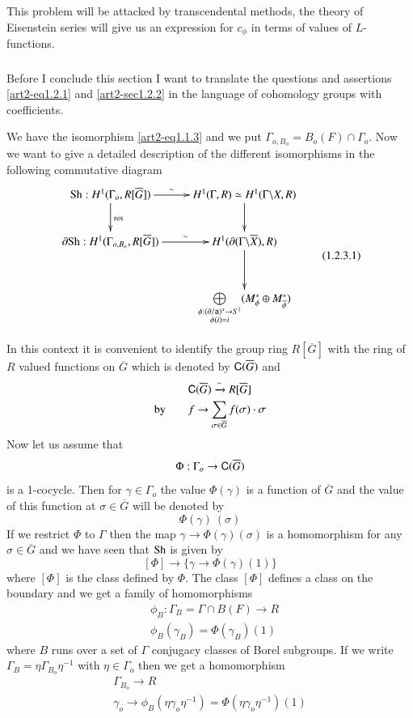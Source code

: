 This problem will be attacked by transcendental methods, the theory of Eisenstein series will give us an expression for $c_{\phi}$ in terms of values of $L$-functions.

\subsubsection{}\label{art2-sec1.2.3}
Before I conclude this section I want to translate the questions and assertions \ref{art2-eq1.2.1} and \ref{art2-sec1.2.2} in the language of cohomology groups with coefficients.

We have the isomorphism \eqref{art2-eq1.1.3} and we put $\Gamma_{o,B_{o}}=B_{o}(F)\cap \Gamma_{o}$. Now we want to give a detailed description of the different isomorphisms in the following commutative diagram
\begin{equation*}
\vcenter{\xymatrix{
\Sh : H^{1}(\Gamma_{o},R[\overline{G}])\ar[r]^-{\sim} \ar[d]^{\res} & H^{1}(\Gamma,R)\simeq H^{1}(\Gamma\backslash X,R)\ar[d]\\
\partial \Sh:H^{1}(\Gamma_{o,B_{o}},R[\overline{G}])\ar[r]^-{\sim} & H^{1}(\partial(\Gamma\backslash \overline{X}),R)\ar[d]\\
 & \bigoplus\limits_{\substack{\phi:(\partial/\sfa)^{x}\to S^{1}\\ \phi(i)=i}}(M^{*}_{\phi}\oplus M^{*}_{\overline{\phi}})
}}\tag{1.2.3.1}\label{art2-eq1.2.3.1}
\end{equation*}

In this context it is convenient to identify the group ring $R[\overline{G}]$ with the ring of $R$ valued functions on $\overline{G}$ which is denoted by $\mathsf{C}(\overline{G})$ and
\begin{align*}
& \mathsf{C}(\overline{G})\xrightarrow{\sim}R[\overline{G}]\\
\text{by}\qquad & f\to \sum\limits_{\sigma\in \overline{G}}f(\sigma)\cdot \sigma
\end{align*}
Now let us assume that
$$
\Phi :\Gamma_{o}\to \mathsf{C}(\overline{G})
$$
is a 1-cocycle. Then for $\gamma\in \Gamma_{o}$ the value $\Phi(\gamma)$ is a function of $\overline{G}$ and the value of this function at $\sigma\in \overline{G}$ will be denoted by
$$
\Phi(\gamma) \ (\sigma)
$$
If we restrict $\Phi$ to $\Gamma$ then the map $\gamma\to \Phi(\gamma)(\sigma)$ is a homomorphism for any\pageoriginale $\sigma\in\overline{G}$ and we have seen that $\mathrm{Sh}$ is given by
$$
[\Phi]\to \{\gamma\to \Phi(\gamma)(1)\}
$$
where $[\Phi]$ is the class defined by $\Phi$. The class $[\Phi]$ defines a class on the boundary and we get a family of homomorphisms
\begin{align*}
& \phi_{B}:\Gamma_{B}=\Gamma\cap B(F)\to R\\
& \phi_{B}(\gamma_{B})=\Phi(\gamma_{B})(1)
\end{align*}
where $B$ runs over a set of $\Gamma$ conjugacy classes of Borel subgroups. If we write $\Gamma_{B}=\eta\Gamma_{B_{o}}\eta^{-1}$ with $\eta\in \Gamma_{o}$ then we get a homomorphism
\begin{gather*}
\Gamma_{B_{o}}\to R\\
\gamma_{o}\to \phi_{B}(\eta\gamma_{o}\eta^{-1})=\Phi(\eta\gamma_{o}\eta^{-1})(1)
\end{gather*}

